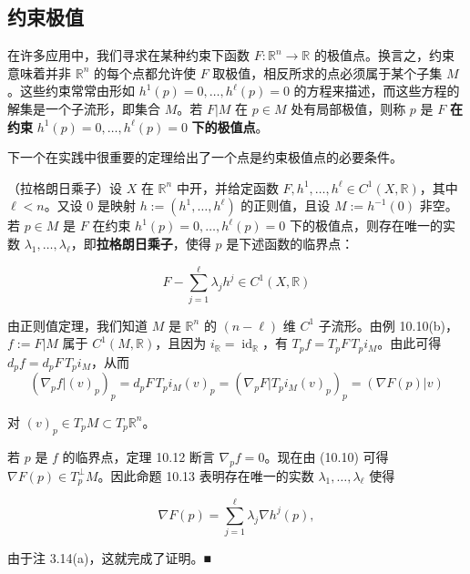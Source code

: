 \subsection*{约束极值}

在许多应用中，我们寻求在某种约束下函数 $ F : \mathbb{R}^{n} \to \mathbb{R} $ 的极值点。换言之，约束意味着并非 $ \mathbb{R}^{n} $ 的每个点都允许使 $ F $ 取极值，相反所求的点必须属于某个子集 $ M $。这些约束常常由形如 $ h^{1}(p) = 0, \ldots, h^{\ell}(p) = 0 $ 的方程来描述，而这些方程的解集是一个子流形，即集合 $ M $。若 $ F|M $ 在 $ p \in M $ 处有局部极值，则称 $ p $ 是 $ F $ \textbf{在约束} $ h^{1}(p) = 0, \ldots, h^{\ell}(p) = 0 $ \textbf{下的极值点}。

下一个在实践中很重要的定理给出了一个点是约束极值点的必要条件。

\begin{theorem}

（拉格朗日乘子）设 $ X $ 在 $ \mathbb{R}^{n} $ 中开，并给定函数 $ F, h^{1}, \ldots, h^{\ell} \in C^{1}(X,\mathbb{R}) $，其中 $ \ell < n $。又设 0 是映射 $ h := (h^{1}, \ldots, h^{\ell}) $ 的正则值，且设 $ M := h^{-1}(0) $ 非空。若 $ p \in M $ 是 $ F $ 在约束 $ h^{1}(p) = 0, \ldots, h^{\ell}(p) = 0 $ 下的极值点，则存在唯一的实数 $ \lambda_{1}, \ldots, \lambda_{\ell} $，即\textbf{拉格朗日乘子}，使得 $ p $ 是下述函数的临界点：

\[
F - \sum_{j=1}^{\ell}\lambda_{j}h^{j} \in C^{1}(X,\mathbb{R})
\]

\proofhead
由正则值定理，我们知道 $ M $ 是 $ \mathbb{R}^{n} $ 的 $ (n-\ell) $ 维 $ C^{1} $ 子流形。由例 10.10(b)，$ f := F|M $ 属于 $ C^{1}(M,\mathbb{R}) $，且因为 $ i_{\mathbb{R}} = \operatorname{id}_{\mathbb{R}} $，有 $ T_{p}f = T_{p}F\,T_{p}i_{M} $。由此可得 $ d_{p}f = d_{p}F\,T_{p}i_{M} $，从而
\begin{equation}
\left(\nabla_{p}f\big|(v)_{p}\right)_{p} = d_{p}F\,T_{p}i_{M}(v)_{p} = \left(\nabla_{p}F\big|T_{p}i_{M}(v)_{p}\right)_{p} = \left(\nabla F(p)\big|v\right)\tag{10.10}
\end{equation}

对 $ (v)_{p} \in T_{p}M \subset T_{p}\mathbb{R}^{n} $。

若 $ p $ 是 $ f $ 的临界点，定理 10.12 断言 $ \nabla_{p}f = 0 $。现在由 (10.10) 可得 $ \nabla F(p) \in T_{p}^{\perp}M $。因此命题 10.13 表明存在唯一的实数 $ \lambda_{1}, \ldots, \lambda_{\ell} $ 使得

\[
\nabla F(p) = \sum_{j=1}^{\ell}\lambda_{j}\nabla h^{j}(p) ,
\]

由于注 3.14(a)，这就完成了证明。\nobreak\hspace{0.35em}■

\end{theorem}

